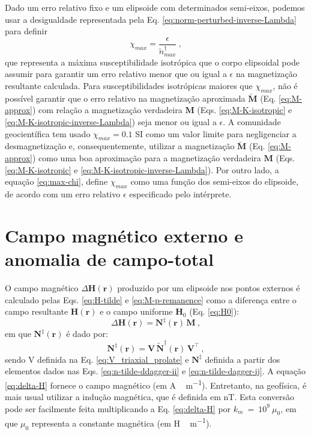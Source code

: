 Dado um erro relativo fixo
e um elipsoide com determinados semi-eixos, podemos usar a desigualdade representada pela 
Eq. \ref{eq:norm-perturbed-inverse-Lambda}
para definir
\begin{equation}
\chi_{max} = \frac{\epsilon}{\tilde{n}^{\dagger}_{max}} \: ,
\label{eq:max-chi}
\end{equation}
que representa a máxima susceptibilidade isotrópica que o corpo elipsoidal
pode assumir para garantir um erro relativo menor que ou igual a $\epsilon$ na magnetização resultante calculada.
Para susceptibilidades isotrópicas maiores que $\chi_{max}$,
não é possível garantir que o erro relativo na magnetização aproximada
$\breve{\mathbf{M}}$ (Eq. \ref{eq:M-approx}) com relação a magnetização verdadeira
$\mathbf{M}$ (Eqs. \ref{eq:M-K-isotropic} e \ref{eq:M-K-isotropic-inverse-Lambda})
seja menor ou igual a $\epsilon$. A comunidade geocientífica tem usado $\chi_{max} = 0.1$ SI
como um valor limite para negligenciar a desmagnetização e, consequentemente, utilizar a magnetização
$\breve{\mathbf{M}}$ (Eq. \ref{eq:M-approx}) como uma boa aproximação para a magnetização
verdadeira $\mathbf{M}$ (Eqs. \ref{eq:M-K-isotropic} e \ref{eq:M-K-isotropic-inverse-Lambda}).
Por outro lado, a equação \ref{eq:max-chi}, define $\chi_{max}$ como uma função dos semi-eixos do elipsoide,
de acordo com um erro relativo $\epsilon$ especificado pelo intérprete.

\section{Campo magnético externo e anomalia de campo-total}

O campo magnético $\Delta {\mathbf{H}}({\mathbf{r}})$ produzido por um elipsoide nos pontos externos é calculado pelas Eqs. \ref{eq:H-tilde} e \ref{eq:M-p-remanence} como a diferença entre o campo resultante ${\mathbf{H}}({\mathbf{r}})$ 
e o campo uniforme ${\mathbf{H}}_{0}$ (Eq. \ref{eq:H0}):
\begin{equation}
\Delta {\mathbf{H}}({\mathbf{r}}) = 
{\mathbf{N}}^{\ddagger}({\mathbf{r}}) \, {\mathbf{M}} \: ,
\label{eq:delta-H}
\end{equation}
em que ${\mathbf{N}}^{\ddagger}({\mathbf{r}})$ é dado por:
\begin{equation}
{\mathbf{N}}^{\ddagger}({\mathbf{r}}) = 
\mathbf{V} \, \tilde{{\mathbf{N}}}^{\ddagger}({\mathbf{r}}) \, \mathbf{V}^{\top}
\label{eq:n-p} \: ,
\end{equation}
sendo V definida na Eq. \ref{eq:V_triaxial_prolate} e $\mathbf{N^{\ddagger}}$ definida a partir dos elementos dados nas Eqs. \ref{eq:n-tilde-ddagger-ii} e \ref{eq:n-tilde-dagger-ij}. A equação \ref{eq:delta-H} fornece o campo magnético (em \unit{A \, m^{-1}}). Entretanto, na geofísica, é mais usual utilizar a indução magnética, que é definida em \unit{nT}. Esta conversão pode ser facilmente feita multiplicando a Eq. \ref{eq:delta-H} por $k_{m}~=~10^{9}~\mu_{0}$, em que $\mu_{0}$ representa a constante magnética (em \unit{H \, m^{-1}}).

